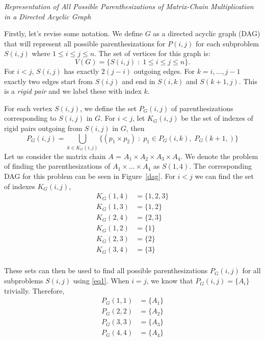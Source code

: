 \documentclass[12pt, a4paper]{article}
\theoremstyle{remark}
\begin{document}
    \textit{\large Representation of All Possible Parenthesizations of Matrix-Chain Multiplication in a Directed
    Acyclic Graph} 

    Firstly, let's revise some notation. We define $G$ as a directed acyclic graph (DAG) that will 
    represent all possible parenthesizations for $P(i,j)$ for each subproblem $S(i,j)$ where 
    $ 1 \leq i \leq j \leq n$. The set of vertices for this graph is:
    \[V(G) = \{S(i,j)\; : \; 1 \leq i \leq j \leq n \}.\]
    For $i < j$, $S(i,j)$ has exactly $2(j-i)$ outgoing edges. For $k = i, \dots, j-1$ exactly two edges 
    start from $S(i.j)$ and end in $S(i, k)$ and $S(k+1, j)$. This is a \emph{rigid pair} 
    and we label these with index $k$. 

    For each vertex $S(i,j)$, we define the set $P_G(i,j)$ of parenthesizations corresponding to $S(i,j)$ in $G$. 
    For $i < j$, let $K_G(i,j)$ be the set of indexes of rigid pairs outgoing from $S(i,j)$ in $G$, then
    \begin{equation}
        P_G(i,j) = \bigcup_{k \in K_G(i,j)} 
        \{(p_1 \times p_2) \; : \; p_1 \in P_G(i,k), \; P_G(k+1, )\} 
        \label{eq1}
    \end{equation}
    Let us consider the matrix chain $A$ = $A_1 \times A_2 \times A_3 \times A_4$. We denote the problem of 
    finding the parenthesizations of $A_1 \times \dots \times A_4$ as $S(1,4)$. The corresponding DAG for this 
    problem can be seen in Figure~\ref{dag}. For $i<j$ we can find the set of indexes $K_G(i,j)$, 
    \begin{equation*}
        \begin{split}
            K_G(1,4) & = \{1,2,3\} \\
            K_G(1,3) & = \{1,2\} \\
            K_G(2,4) & = \{2,3\} \\
            K_G(1,2) & = \{1\} \\
            K_G(2,3) & = \{2\} \\
            K_G(3,4) & = \{3\}\\
        \end{split}
    \end{equation*}

    These sets can then be used to find all possible parenthesizations $P_G(i,j)$ for 
    all subproblems $S(i,j)$ using \ref{eq1}. When $i = j$, we know that $P_G(i,j) = \{A_i\}$ trivially.
    Therefore, 
    \begin{equation*}
        \begin{split}
            P_G(1,1) & = \{A_1\} \\
            P_G(2,2) & = \{A_2\} \\
            P_G(3,3) & = \{A_3\} \\
            P_G(4,4) & = \{A_4\} \\
        \end{split}
    \end{equation*}
    
\end{document}
